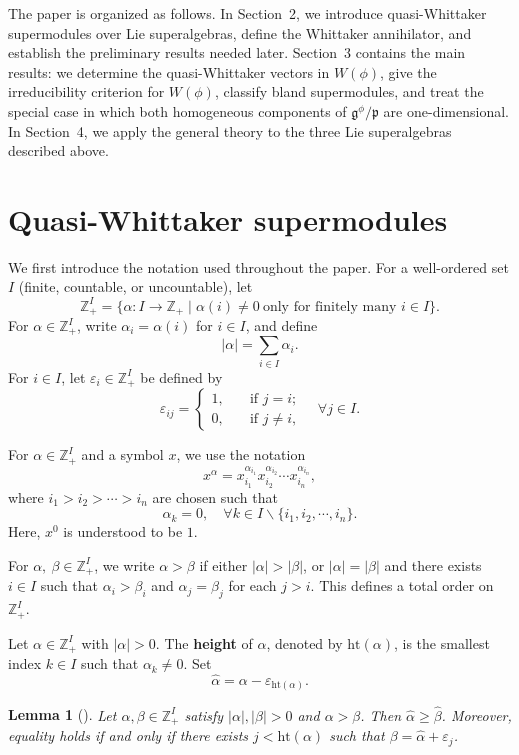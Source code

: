 \documentclass[12pt,reqno]{article}
\newtheorem{lem}[thm]{Lemma}
\def\a{\alpha}
\def\b{\beta}
\def\F{\mathfrak}
\def\r{\mathrm}
\def\ZZ{\mathbb{Z}}
\def\beqn{\begin{equation*}}
\def\eeqn{\end{equation*}}
\begin{document}
The paper is organized as follows. In Section~2, we introduce quasi-Whittaker supermodules over Lie superalgebras, define the Whittaker annihilator, and establish the preliminary results needed later. Section~3 contains the main results: we determine the quasi-Whittaker vectors in $W(\phi)$, give the irreducibility criterion for $W(\phi)$, classify bland supermodules, and treat the special case in which both homogeneous components of $\F{g}^{\phi}/\F{p}$ are one-dimensional. In Section~4, we apply the general theory to the three Lie superalgebras described above.


\section{Quasi-Whittaker supermodules}


We first introduce the notation used throughout the paper. For a well-ordered set $I$ (finite, countable, or uncountable), let
\beqn
\ZZ_+^I=\{\a\colon I\rightarrow \ZZ_+\mid \a(i)\neq 0~\text{only for finitely many $i\in I$}\}.
\eeqn 
For $\a\in\ZZ_+^I$,  write $\a_i=\a(i)$ for $i\in I$, and define 
\beqn
|\a|=\sum_{i\in I}\a_i.
\eeqn
For $i\in I$, let $\varepsilon_i\in\ZZ_+^I$ be defined by
\beqn
\varepsilon_{ij}=\begin{cases}
	1, \quad &\text{if $j= i$};\\
	0, \quad &\text{if $j\neq i$},
\end{cases}\quad \forall j\in I.
\eeqn


For $\a\in\ZZ_+^I$ and a symbol $x$, we use the notation
\beqn
x^\a=x_{i_1}^{\a_{i_1}}x_{i_2}^{\a_{i_2}}\cdots x_{i_n}^{\a_{i_n}}, 
\eeqn
where $i_1>i_2>\cdots>i_n$ are chosen such that 
\beqn
\a_k=0, \quad\forall k\in I\backslash \{i_1, i_2, \cdots, i_n\}.
\eeqn
Here, $x^{0}$ is understood to be $1$.

For $\a, ~\b\in\ZZ_+^I$, we write $\a>\b$ if either $|\a|>|\b|$, or $|\a|=|\b|$ and there exists $i\in I$ such that $\a_i>\b_i$ and  $\a_j=\b_j$ for each  $j>i$. This defines a total order on $\ZZ_+^I$.


Let $\a\in\ZZ_+^I$ with $|\a|>0$. The {\bf height} of $\a$, denoted by $\r{ht}(\a)$, is the smallest index $k\in I$ such that $\a_k\neq0$. Set
\beqn
\hat{\a}=\a-\varepsilon_{\r{ht}(\a)}.
\eeqn

\begin{lem}[\cite{CGLZZ}]\label{L2.1}
	Let $\a,\b\in\ZZ^I_+$ satisfy $|\a|,|\b|>0$ and $\a>\b$. Then $\hat{\a}\geq\hat{\b}$. Moreover, equality holds if and only if there exists $j<\r{ht}(\a)$ such that $\b=\hat{\a}+\varepsilon_j$.
\end{lem}
\end{document}
